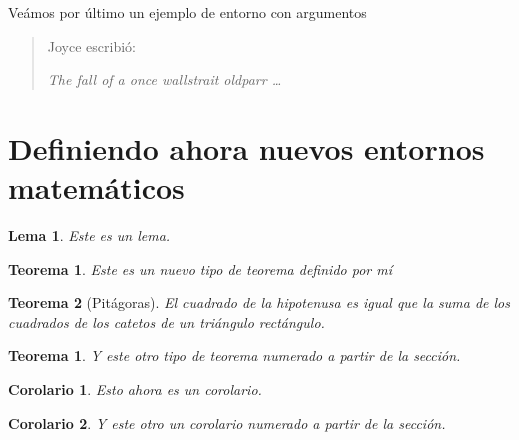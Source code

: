 \documentclass[11pt]{article}
\begin{document}
Veámos por último un ejemplo de entorno con argumentos

\begin{Example}[gobble=0]
\newenvironment{qsi}[1]%
{\begin{quote}#1 escribi\'o: \begin{sloppypar}\it}%
{\end{sloppypar}\end{quote}}

\begin{qsi}{Joyce}
	The fall of a once wallstrait oldparr \ldots
\end{qsi}
\end{Example}

\section{Definiendo ahora nuevos entornos  matemáticos}

\newtheorem{teo}{Teorema}
\newtheorem{teo-sec}{Teorema}[section]
\newtheorem{corol}{Corolario}%
\newtheorem{corol-sec}[teo-sec]{Corolario}
\newtheorem{lema}{Lema}%

\begin{lema}
	Este es un lema.
\end{lema}

\begin{teo}
	Este es un nuevo tipo de teorema definido por mí
\end{teo}

\begin{teo}[Pitágoras]
	El cuadrado de la hipotenusa es igual que la suma de los cuadrados de los catetos de un triángulo rectángulo.
\end{teo}

\begin{teo-sec}
	Y este otro tipo de teorema numerado a partir de la sección.
\end{teo-sec}

\begin{corol}
	Esto ahora es un corolario.
\end{corol}

\begin{corol-sec}
	Y este otro un corolario numerado a partir de la sección.
\end{corol-sec}
\end{document}
